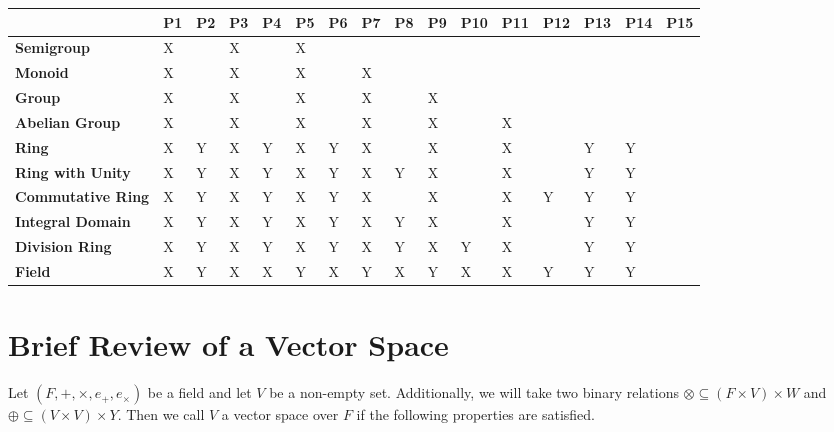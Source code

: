 \documentclass[12pt, a4paper]{article}
\begin{document}
\begin{landscape}
\begin{table}[]
\centering
\begin{tabular}{|l|l|l|l|l|l|l|l|l|l|l|l|l|l|l|l|}
\hline
 & \textbf{P1} & \textbf{P2} & \textbf{P3} & \textbf{P4} & \textbf{P5} & \textbf{P6} & \textbf{P7} & \textbf{P8} & \textbf{P9} & \textbf{P10} & \textbf{P11} & \textbf{P12} & \textbf{P13} & \textbf{P14} & \textbf{P15} \\ \hline
\textbf{Semigroup} & X &  & X &  & X &  &  &  &  &  &  &  &  &  &  \\ \hline
\textbf{Monoid} & X &  & X &  & X &  & X &  &  &  &  &  &  &  &  \\ \hline
\textbf{Group} & X &  & X &  & X &  & X &  & X &  &  &  &  &  &  \\ \hline
\textbf{Abelian Group} & X &  & X &  & X &  & X &  & X &  & X &  &  &  &  \\ \hline
\textbf{Ring} & X & Y & X & Y & X & Y & X &  & X &  & X &  & Y & Y &  \\ \hline
\textbf{Ring with Unity} & X & Y & X & Y & X & Y & X & Y & X &  & X &  & Y & Y &  \\ \hline
\textbf{Commutative Ring} & X & Y & X & Y & X & Y & X &  & X &  & X & Y & Y & Y &  \\ \hline
\textbf{Integral Domain} & X & Y & X & Y & X & Y & X & Y & X &  & X &  & Y & Y &  \\ \hline
\textbf{Division Ring} & X & Y & X & Y & X & Y & X & Y & X & Y & X &  & Y & Y &  \\ \hline
\textbf{Field} & X & Y & X & X & Y & X & Y & X & Y & X & X & Y & Y & Y &  \\ \hline
\end{tabular}
\end{table}
\end{landscape}

\newpage

\section{Brief Review of a Vector Space}

Let $(F,+,\times, e_{+},e_{\times})$ be a field and let $V$ be a non-empty set. Additionally, we will take two binary relations $\otimes\subseteq(F\times V)\times W$ and $\oplus\subseteq(V\times V)\times Y$. Then we call $V$ a vector space over $F$ if the following properties are satisfied.
\end{document}
